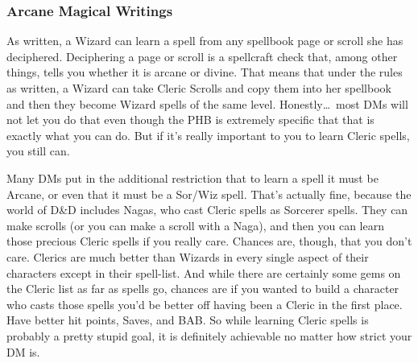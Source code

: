 \subsubsection{Arcane Magical Writings}

As written, a Wizard can learn a spell from any spellbook page or scroll she has deciphered. Deciphering a page or scroll is a spellcraft check that, among other things, tells you whether it is arcane or divine. That means that under the rules as written, a Wizard can take Cleric Scrolls and copy them into her spellbook and then they become Wizard spells of the same level. Honestly\ldots\  most DMs will not let you do that even though the PHB is extremely specific that that is exactly what you can do. But if it's really important to you to learn Cleric spells, you still can.

Many DMs put in the additional restriction that to learn a spell it must be Arcane, or even that it must be a Sor/Wiz spell. That's actually fine, because the world of D\&D includes Nagas, who cast Cleric spells as Sorcerer spells. They can make scrolls (or you can make a scroll with a Naga), and then you can learn those precious Cleric spells if you really care. Chances are, though, that you don't care. Clerics are much better than Wizards in every single aspect of their characters except in their spell-list. And while there are certainly some gems on the Cleric list as far as spells go, chances are if you wanted to build a character who casts those spells you'd be better off having been a Cleric in the first place. Have better hit points, Saves, and BAB. So while learning Cleric spells is probably a pretty stupid goal, it is definitely achievable no matter how strict your DM is.
